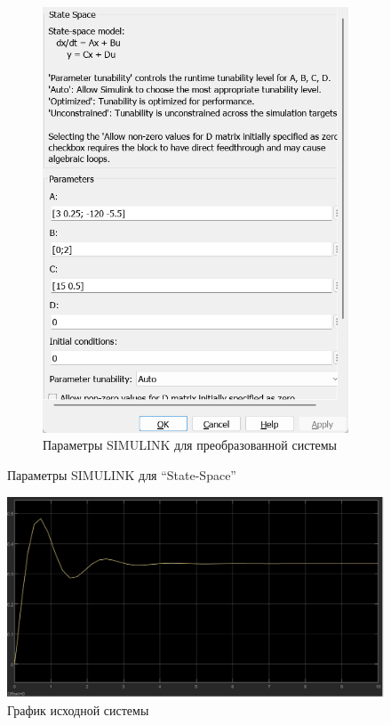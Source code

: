 \documentclass[a4paper, 12pt]{article}
\begin{document}
\begin{figure}[H]
\begin{subfigure}{0.3\textwidth}
            \includegraphics[width=\linewidth]{new_model_3_window.png}
            \caption{Параметры SIMULINK для преобразованной системы}
            \label{fig:nm3w}
        \end{subfigure}
        \caption{Параметры SIMULINK для ``State-Space''}
        \label{fig:windows3}
    \end{figure}
    \begin{figure}[H]
        \centering
        \includegraphics[scale=0.3]{model_3.jpg}
        \captionsetup{skip=0pt}
        \caption{График исходной системы}
        \label{fig:m3}
    \end{figure}
\end{document}
